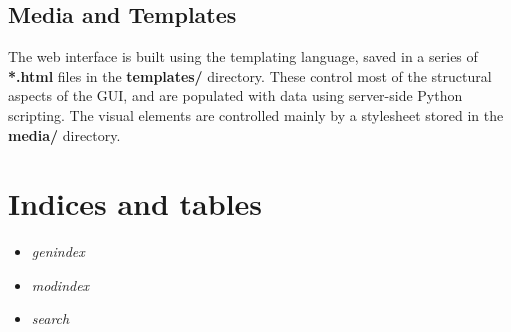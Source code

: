 \documentclass[letterpaper,10pt,english]{sphinxmanual}
\begin{document}
\section{Media and Templates}
\label{development:media-and-templates}
The web interface is built using the  templating language, saved in a series of \textbf{*.html} files in the \textbf{templates/} directory.  These control most of the structural aspects of the GUI, and are populated with data using server-side Python scripting.  The visual elements are controlled mainly by a stylesheet stored in the \textbf{media/} directory.


\chapter{Indices and tables}
\label{index:indices-and-tables}\begin{itemize}
\item {} 
\emph{genindex}

\item {} 
\emph{modindex}

\item {} 
\emph{search}

\end{itemize}



\renewcommand{\indexname}{Index}
\printindex
\end{document}

